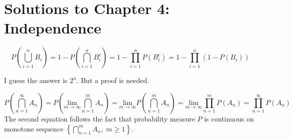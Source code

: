 \section{Solutions to Chapter 4: Independence}
\label{sec:solutions-chapter-4}

\setcounter{Lcount}{0}
\begin{list}{4.6.}{}
\item
  \[
    P\left(\bigcup\limits_{i=1}^nB_i\right)
    = 1 - P\left(\bigcap\limits_{i = 1}^nB_i^c\right)
    = 1 - \prod\limits_{i = 1}^n P\left(B_i^c\right)
    = 1 - \prod\limits_{i = 1}^n\left(1 - P\left(B_i\right)\right)
  \]
  
\item I guess the answer is $2^n$. But a proof is needed.
  
\item
  \[
    P\left(\bigcap\limits_{n = 1}^\infty A_n\right)
    = P\left(\underset{m\rightarrow\infty}{\mathrm{lim}}\bigcap\limits_{n = 1}^m A_n\right)
    = \underset{m\rightarrow\infty}{\mathrm{lim}}P\left(\bigcap\limits_{n = 1}^mA_n\right)
    = \underset{m\rightarrow\infty}{\mathrm{lim}}\prod\limits_{n=1}^mP\left(A_n\right)
    = \prod\limits_{n=1}^\infty P\left(A_n\right)
  \]
  The second equation follows the fact that probability measure $P$ is continuous on monotone sequence $\left\{\bigcap\limits_{n=1}^mA_n,\;m\geq1\right\}$.
\end{list}

\clearpage{}

